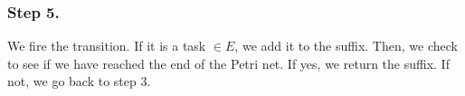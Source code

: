\documentclass[runningheads]{llncs}
\begin{document}
\subsubsection{Step 5.} We fire the transition. If it is a task $\in E$, we add it to the suffix. Then, we check to see if we have reached the end of the Petri net. If yes, we return the suffix. If not, we go back to step 3.










\end{document}
